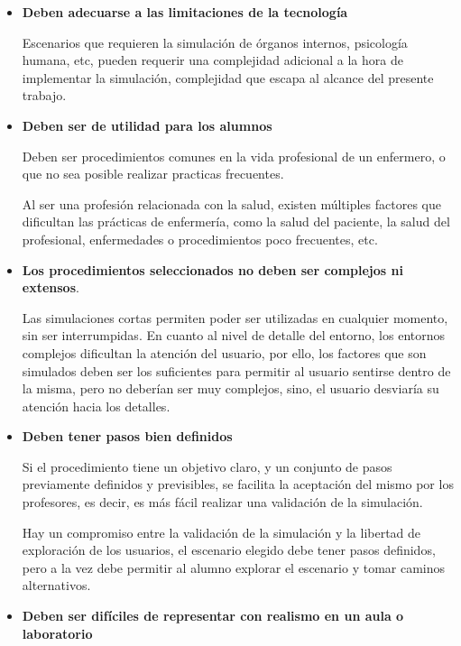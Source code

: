 \begin{itemize}

\item \textbf{Deben adecuarse a las limitaciones de la tecnología} 

    Escenarios que requieren la simulación de órganos internos, psicología
    humana, etc, pueden requerir una complejidad adicional a la hora de
    implementar la simulación, complejidad que escapa al alcance del
    presente trabajo.

\item \textbf{Deben ser de utilidad para los alumnos} 

    
    Deben ser procedimientos comunes en la vida profesional de un enfermero, o
    que no sea posible realizar practicas frecuentes. 

    Al ser una profesión relacionada con la salud, existen múltiples factores
    que dificultan las prácticas de enfermería, como la salud del paciente, la
    salud del profesional, enfermedades o procedimientos poco frecuentes, etc.

\item \textbf{Los procedimientos seleccionados no deben ser complejos ni
        extensos}. 

    Las simulaciones cortas permiten poder ser utilizadas en cualquier momento,
    sin ser interrumpidas. En cuanto al nivel de detalle del entorno, los
    entornos complejos dificultan la atención del
    usuario\cite{videojuegos:gonzaleztardon}, por ello, los factores que son
    simulados deben ser los suficientes para permitir al usuario sentirse dentro
    de la misma, pero no deberían ser muy complejos, sino, el usuario desviaría su
    atención hacia los detalles.

\item \textbf{Deben tener pasos bien definidos}
    
    Si el procedimiento tiene un objetivo claro, y un conjunto de pasos
    previamente definidos y previsibles, se facilita la aceptación del mismo por
    los profesores, es decir, es más fácil realizar una validación de la
    simulación.

    Hay un compromiso entre la validación de la simulación y la libertad de
    exploración de los usuarios, el escenario elegido debe tener pasos
    definidos, pero a la vez debe permitir al alumno explorar el escenario y
    tomar caminos alternativos.

\item \textbf{Deben ser difíciles de representar con realismo en un aula o
        laboratorio}


\end{itemize}
